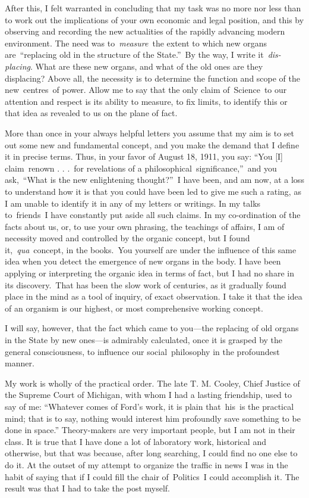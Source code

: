 \documentclass[openany,nobib]{tufte-book}
\begin{document}
After this, I felt warranted in concluding that my task was no more nor
less than to work out the implications of your own economic and legal
position, and this by observing and recording the new actualities of the
rapidly advancing modern environment. The need was to~\emph{measure}~the
extent to which new organs are~``replacing old in the structure of the
State.''~By the way, I write it~\emph{dis-placing}. What are these new
organs, and what of the old ones are they displacing? Above all, the
necessity is to determine the function and scope of the new~centres~of
power. Allow me to say that the only claim of~Science~to our attention
and respect is its ability to measure, to fix limits, to identify this
or that idea as revealed to us on the plane of fact.~

More than once in your always helpful letters you assume that my aim is
to set out some new and fundamental concept, and you make the demand
that I define it in precise terms. Thus, in your favor of August 18,
1911, you say: ``You {[}I{]} claim~renown . . .~for revelations of a
philosophical~significance,''~and you ask,~``What is the new
enlightening thought?''~I have been, and am now, at a loss to understand
how it is that you could have been led to give me such a rating, as I am
unable to identify it in any of my letters or writings. In my talks
to~friends~I have constantly put aside all such claims. In my
co-ordination of the facts about us, or, to use your own phrasing, the
teachings of affairs, I am of necessity moved and controlled by the
organic concept, but I found it,~\emph{qua}~concept, in the books.~You
yourself are under the influence of this same idea when you detect the
emergence of new organs in the body. I have been applying or
interpreting the organic idea in terms of fact, but I had no share in
its discovery.~That has been the slow work of centuries, as it gradually
found place in the mind as a tool of inquiry, of exact observation. I
take it that the idea of an organism is our highest, or most
comprehensive working concept.~

I will say, however, that the fact which came to you---the replacing of
old organs in the State by new ones---is admirably calculated, once it
is grasped by the general consciousness, to influence our
social~philosophy in the profoundest manner.~

My work is wholly of the practical order. The late T. M. Cooley, Chief
Justice of the Supreme Court of Michigan, with whom I had a lasting
friendship, used to say of me: ``Whatever comes of Ford's work, it is
plain that~his~is the practical mind; that is to say, nothing would
interest him profoundly save something to be done in space.''
Theory-makers are very important people, but I am not in their class. It
is true that I have done a lot of laboratory work, historical and
otherwise, but that was because, after long searching, I could find no
one else to do it. At the outset of my attempt to organize the traffic
in news I was in the habit of saying that if I could fill the chair
of~Politics~I could accomplish it. The result was that I had to take the
post myself.~
\end{document}
